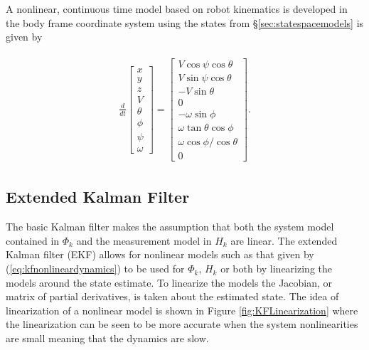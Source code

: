 A nonlinear, continuous time model based on robot kinematics is developed in the body frame coordinate system using the states from \S\ref{sec:statespacemodels} is given by

\begin{align}
\label{eq:kfnonlineardynamics}
\begin{split}
\frac{d}{dt}\left[\begin{array}{c}
x \\ y \\ z \\ V \\ \theta \\ \phi \\ \psi \\ \omega
\end{array}\right] =
\left[\begin{array}{c}
V\cos\psi\cos\theta \\
V\sin\psi\cos\theta \\
-V\sin\theta \\
0 \\
-\omega\sin\phi \\
\omega\tan\theta\cos\phi \\
\omega\cos\phi/\cos\theta \\
0
\end{array}\right].
\end{split}
\end{align}

\subsection{Extended Kalman Filter}
\label{sec:extendedkf}
The basic Kalman filter makes the assumption that both the system model contained in $\Phi_k$ and the measurement model in $H_k$ are linear. The extended Kalman filter (EKF) allows for nonlinear models such as that given by (\ref{eq:kfnonlineardynamics}) to be used for $\Phi_k$, $H_k$ or both by linearizing the models around the state estimate. To linearize the models the Jacobian, or matrix of partial derivatives, is taken about the estimated state. The idea of linearization of a nonlinear model is shown in Figure \ref{fig:KFLinearization} where the linearization can be seen to be more accurate when the system nonlinearities are small meaning that the dynamics are slow.

